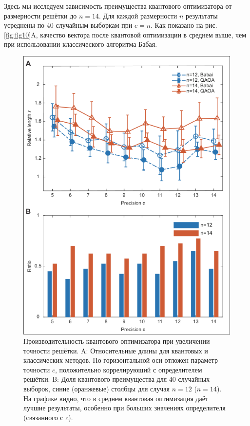 Здесь мы исследуем зависимость преимущества квантового оптимизатора от
размерности решётки до $n = 14$. Для каждой размерности $n$ результаты
усреднены по 40 случайным выборкам при $c = n$. Как показано на рис.
\ref{fig:fig10}A, качество вектора после квантовой оптимизации в среднем выше,
чем при использовании классического алгоритма Бабая.
\begin{figure}
    \centering
    \includegraphics[scale=0.6]{inc/fig_09.png}
    \caption{
    Производительность квантового оптимизатора при увеличении точности решётки.
    A: Относительные длины для квантовых и классических методов. По
    горизонтальной оси отложен параметр точности $c$, положительно
    коррелирующий с определителем решётки. B: Доля квантового преимущества для
    40 случайных выборок, синие (оранжевые) столбцы для случая $n = 12$ ($n =
    14$). На графике видно, что в среднем квантовая оптимизация даёт лучшие
    результаты, особенно при больших значениях определителя (связанного с $c$).
    }
    \label{fig:fig09}
\end{figure}

